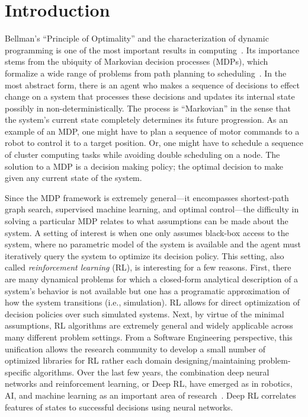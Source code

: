 \setcounter{secnumdepth}{0}
\chapter{Introduction}
Bellman's ``Principle of Optimality'' and the characterization of dynamic programming is one of the most important results in computing~\cite{bellman2013dynamic}. Its importance stems from the ubiquity of Markovian decision processes (MDPs), which formalize a wide range of problems from path planning to scheduling~\cite{howard1966dynamic}. In the most abstract form, there is an agent who makes a sequence of decisions to effect change on a system that processes these decisions and updates its internal state possibly in non-deterministically. 
The process is ``Markovian'' in the sense that the system's current state completely determines its future progression. As an example of an MDP, one might have to plan a sequence of motor commands to a robot to control it to a target position. Or, one might have to schedule a sequence of cluster computing tasks while avoiding double scheduling on a node. 
The solution to a MDP is a decision making policy; the optimal decision to make given any current state of the system. 

Since the MDP framework is extremely general---it encompasses shortest-path graph search, supervised machine learning, and optimal control---the difficulty in solving a particular MDP relates to what assumptions can be made about the system.
A setting of interest is when one only assumes black-box access to the system, where no parametric model of the system is available and the agent must iteratively query the system to optimize its decision policy.
This setting, also called \emph{reinforcement learning} (RL), is interesting for a few reasons.
First, there are many dynamical problems for which a closed-form analytical description of a system's behavior is not available but one has a programatic approximation of how the system transitions (i.e., simulation).
RL allows for direct optimization of decision policies over such simulated systems.
Next, by virtue of the minimal assumptions, RL algorithms are extremely general and widely applicable across many different problem settings.
From a Software Engineering perspective, this unification allows the research community to develop a small number of optimized libraries for RL rather each domain designing/maintaining problem-specific algorithms.
Over the last few years, the combination deep neural networks and reinforcement learning, or Deep RL, have emerged as in robotics, AI, and machine learning as an important area of research~\cite{mnih2015human,silver2017mastering, sunderhauf2018limits, stoica2017berkeley}.
Deep RL correlates features of states to successful decisions using neural networks. 


